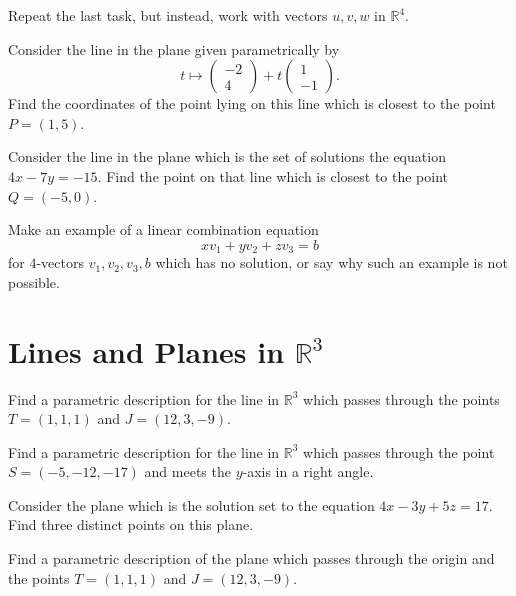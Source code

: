\documentclass[cahier-main.tex]{subfiles}
\begin{document}
\begin{task}
Repeat the last task, but instead, work with vectors $u, v, w$ in $\mathbb{R}^4$.
\end{task}


\begin{task}
Consider the line in the plane given parametrically by 
\[
t \mapsto \begin{pmatrix} -2 \\ 4 \end{pmatrix} + t \begin{pmatrix} 1 \\ -1\end{pmatrix}.
\]
Find the coordinates of the point lying on this line which is closest to the point $P = (1,5)$.
\end{task}


\begin{task}
Consider the line in the plane which is the set of solutions the equation $4x-7y=-15$. Find the point on that line which is closest to the point $Q=(-5,0)$.
\end{task}

\begin{task}
Make an example of a linear combination equation 
\[
xv_1 + y v_2 + z v_3 = b
\]
for $4$-vectors $v_1, v_2, v_3, b$ which has no solution, or say why such an example is not possible.
\end{task}

\section*{Lines and Planes in $\mathbb{R}^3$}


\begin{task}
Find a parametric description for the line in $\mathbb{R}^3$ which passes through the points $T = (1,1,1)$ and $J=(12,3,-9)$.
\end{task}


\begin{challenge}
Find a parametric description for the line in $\mathbb{R}^3$ which passes through the point $S = (-5,-12,-17)$ and meets the $y$-axis in a right angle.
\end{challenge}

\begin{task}
Consider the plane which is the solution set to the equation
$4x-3y+5z=17$. Find three distinct points on this plane.
\end{task}


\begin{task}
Find a parametric description of the plane which passes through the origin and the points $T = (1,1,1)$ and $J = (12,3,-9)$.
\end{task}
\end{document}
